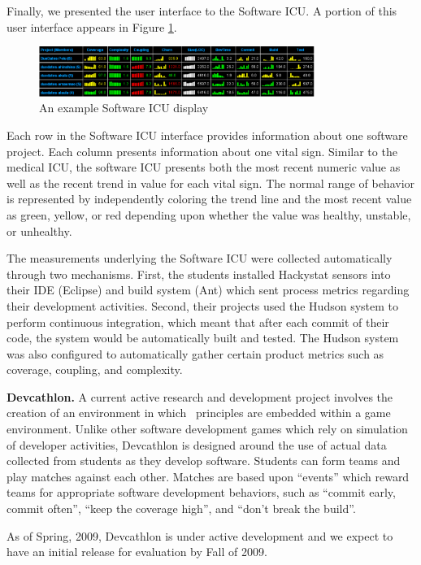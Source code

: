 Finally, we presented the user interface to the Software ICU. A portion of
this user interface appears in Figure \ref{fig:sicu}.

\begin{figure}[ht]
  \center
  \includegraphics[width=0.8\textwidth]{portfolio-2008.eps}
  \caption{An example Software ICU display}
  \label{fig:sicu}
\end{figure} 

Each row in the Software ICU interface provides information about one
software project.  Each column presents information about one vital
sign. Similar to the medical ICU, the software ICU presents both the most
recent numeric value as well as the recent trend in value for each vital
sign.  The normal range of behavior is represented by independently
coloring the trend line and the most recent value as green, yellow, or red
depending upon whether the value was healthy, unstable, or unhealthy.

The measurements underlying the Software ICU were collected automatically
through two mechanisms. First, the students installed Hackystat sensors
into their IDE (Eclipse) and build system (Ant) which sent process
metrics regarding their development activities.  Second, their projects
used the Hudson system to perform continuous integration, which meant that
after each commit of their code, the system would be automatically built
and tested.  The Hudson system was also configured to automatically gather
certain product metrics such as coverage, coupling, and complexity.

{\bf Devcathlon.} A current active research and development project
involves the creation of an environment in which \eCT\ principles are
embedded within a game environment.  Unlike other software development
games which rely on simulation of developer activities, Devcathlon is
designed around the use of actual data collected from students as they
develop software.  Students can form teams and play matches against each
other.  Matches are based upon ``events'' which reward teams for
appropriate software development behaviors, such as ``commit early, commit
often'', ``keep the coverage high'', and ``don't break the build''.

As of Spring, 2009, Devcathlon is under active development and we expect to
have an initial release for evaluation by Fall of 2009.



